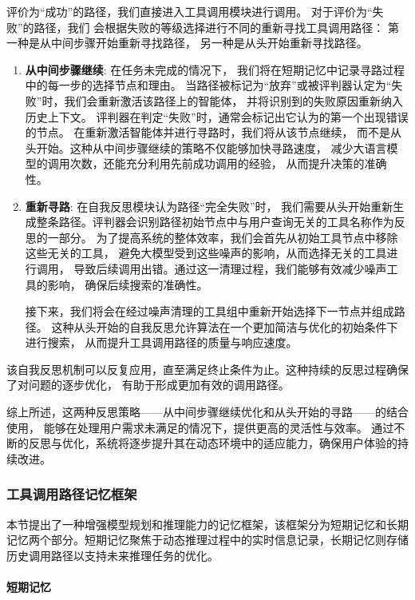 评价为“成功”的路径，我们直接进入工具调用模块进行调用。
对于评价为“失败”的路径，我们
会根据失败的等级选择进行不同的重新寻找工具调用路径：
第一种是从中间步骤开始重新寻找路径，
另一种是从头开始重新寻找路径。

\begin{enumerate}
  \item \textbf{从中间步骤继续}: 在任务未完成的情况下，
  我们将在短期记忆中记录寻路过程中的每一步的选择节点和理由。
  当路径被标记为“放弃”或被评判器认定为“失败”时，我们会重新激活该路径上的智能体，
  并将识别到的失败原因重新纳入历史上下文。
  评判器在判定“失败”时，通常会标记出它认为的第一个出现错误的节点。
  在重新激活智能体并进行寻路时，我们将从该节点继续，
  而不是从头开始。这种从中间步骤继续的策略不仅能够加快寻路速度，
  减少大语言模型的调用次数，还能充分利用先前成功调用的经验，
  从而提升决策的准确性。
  \item \textbf{重新寻路}: 在自我反思模块认为路径“完全失败”时，
  我们需要从头开始重新生成整条路径。评判器会识别路径初始节点中与用户查询无关的工具名称作为反思的一部分。
  为了提高系统的整体效率，我们会首先从初始工具节点中移除这些无关的工具，
  避免大模型受到这些噪声的影响，从而选择无关的工具进行调用，
  导致后续调用出错。通过这一清理过程，我们能够有效减少噪声工具的影响，
  确保后续搜索的准确性。\par
  接下来，我们将会在经过噪声清理的工具组中重新开始选择下一节点并组成路径。
  这种从头开始的自我反思允许算法在一个更加简洁与优化的初始条件下进行搜索，
  从而提升工具调用路径的质量与响应速度。
\end{enumerate}
 
该自我反思机制可以反复应用，直至满足终止条件为止。这种持续的反思过程确保了对问题的逐步优化，
有助于形成更加有效的调用路径。

综上所述，这两种反思策略——从中间步骤继续优化和从头开始的寻路——的结合使用，
能够在处理用户需求未满足的情况下，提供更高的灵活性与效率。
通过不断的反思与优化，系统将逐步提升其在动态环境中的适应能力，确保用户体验的持续改进。

\subsubsection{工具调用路径记忆框架}

本节提出了一种增强模型规划和推理能力的记忆框架，该框架分为短期记忆和长期记忆两个部分。短期记忆聚焦于动态推理过程中的实时信息记录，长期记忆则存储历史调用路径以支持未来推理任务的优化。

\paragraph{短期记忆}

